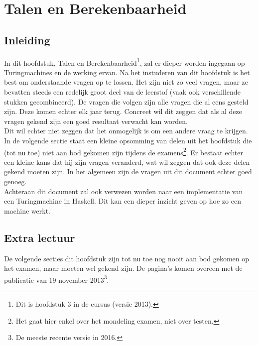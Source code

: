 \documentclass[10pt,a4paper]{article}
\begin{document}
\newpage


\section{Talen en Berekenbaarheid}

\subsection{Inleiding}

\vspace{3mm}
In dit hoofdstuk, Talen en Berekenbaarheid\footnote{Dit is hoofdstuk 3 in de cursus (versie 2013).}, zal er dieper worden ingegaan op Turingmachines en de werking ervan. Na het instuderen van dit hoofdstuk is het best om onderstaande vragen op te lossen. Het zijn niet zo veel vragen, maar ze bevatten steeds een redelijk groot deel van de leerstof (vaak ook verschillende stukken gecombineerd). De vragen die volgen zijn alle vragen die al eens gesteld zijn. Deze komen echter elk jaar terug. Concreet wil dit zeggen dat als al deze vragen gekend zijn een goed resultaat verwacht kan worden.\\

Dit wil echter niet zeggen dat het onmogelijk is om een andere vraag te krijgen. In de volgende sectie staat een kleine opsomming van delen uit het hoofdstuk die (tot nu toe) niet aan bod gekomen zijn tijdens de examens\footnote{Het gaat hier enkel over het mondeling examen, niet over testen.}. Er bestaat echter een kleine kans dat hij zijn vragen veranderd, wat wil zeggen dat ook deze delen gekend moeten zijn. In het algemeen zijn de vragen uit dit document echter goed genoeg.\\

Achteraan dit document zal ook verwezen worden naar een implementatie van een Turingmachine in Haskell. Dit kan een dieper inzicht geven op hoe zo een machine werkt.

\subsection{Extra lectuur}

De volgende secties dit hoofdstuk zijn tot nu toe nog nooit aan bod gekomen op het examen, maar moeten wel gekend zijn. De pagina's komen overeen met de publicatie van 19 november 2013\footnote{De meeste recente versie in 2016.}.
\end{document}
